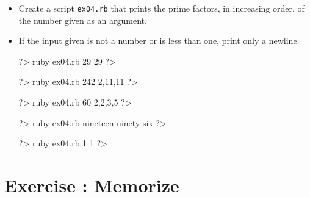 \documentclass{42-en}
\begin{document}
\makeheaderfiles

\begin{itemize}

\item Create a script \texttt{ex04.rb} that prints the prime factors, in increasing order, of the number given as an argument.
\item If the input given is not a number or is less than one, print only a newline.

\begin{42console}
	?> ruby ex04.rb 29
	29
	?>
\end{42console}

\begin{42console}
	?> ruby ex04.rb 242
	2,11,11
	?>
\end{42console}

\begin{42console}
	?> ruby ex04.rb 60
	2,2,3,5
	?>
\end{42console}

\begin{42console}
	?> ruby ex04.rb nineteen ninety six
	?>
\end{42console}

\begin{42console}
	?> ruby ex04.rb 1
	1
	?>
\end{42console}

\end{itemize}


\chapter{Exercise \exercicenumber: Memorize}

\exnumber{\exercicenumber}
\makeheaderfiles
\end{document}
